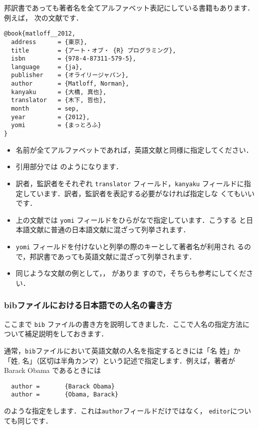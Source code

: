 \documentclass[a4j,10pt]{jarticle}
\begin{document}
邦訳書であっても著者名を全てアルファベット表記にしている書籍もあります．例えば，
次の文献です．
\begin{screen}
\begin{verbatim}
@book{matloff__2012,
  address      = {東京},
  title        = {アート・オブ・ {R} プログラミング},
  isbn         = {978-4-87311-579-5},
  language     = {ja},
  publisher    = {オライリージャパン},
  author       = {Matloff, Norman},
  kanyaku      = {大橋, 真也},
  translator   = {木下, 哲也},
  month        = sep,
  year         = {2012},
  yomi         = {まっとろふ}
}
\end{verbatim}
\end{screen}
\begin{itemize}
 \item 名前が全てアルファベットであれば，英語文献と同様に指定してください．
 \item 引用部分では \citet{matloff__2012} のようになります．
 \item 訳者，監訳者をそれぞれ \texttt{translator} フィールド，\texttt{kanyaku}
       フィールドに指定しています．訳者，監訳者を表記する必要がなければ指定しな
       くてもいいです．
 \item 上の文献では \texttt{yomi} フィールドをひらがなで指定しています．こうする
       と日本語文献に普通の日本語文献に混ざって列挙されます．
 \item \texttt{yomi} フィールドを付けないと列挙の際のキーとして著者名が利用され
       るので，邦訳書であっても英語文献に混ざって列挙されます．
 \item 同じような文献の例として，\citet{Ryza2016}，\citet{Boswell-2012} がありま
       すので，そちらも参考にしてください．
\end{itemize}

\subsubsection{bibファイルにおける日本語での人名の書き方}
\label{sec:nihonjin}

ここまで \texttt{bib} ファイルの書き方を説明してきました．ここで人名の指定方法に
ついて補足説明をしておきます．

通常，\texttt{bib}ファイルにおいて英語文献の人名を指定するときには「名 姓」か
「姓, 名」（区切は半角カンマ）という記述で指定します．例えば，著者が Barack
Obama であるときには
\begin{screen}
 \begin{verbatim}
  author =       {Barack Obama}
  author =       {Obama, Barack}
 \end{verbatim}
\end{screen}
のような指定をします．これは\texttt{author}フィールドだけではなく，
\texttt{editor}についても同じです．
\end{document}
